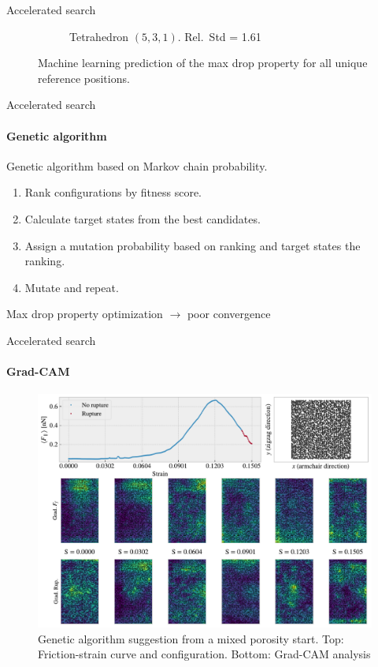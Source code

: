 \documentclass[
	10pt, %
]{beamer}
\begin{document}
\begin{frame}{Accelerated search}
\begin{figure}[H]
\begin{subfigure}[t]{0.49\textwidth}
			\caption{Tetrahedron $(5,3,1)$. Rel.\ Std = 1.61}
		\end{subfigure}
		\caption{Machine learning prediction of the max drop property for all unique reference positions.}
	\end{figure}
\end{frame}
%
%
\begin{frame}{Accelerated search}
	\framesubtitle{Genetic algorithm}
	Genetic algorithm based on Markov chain probability. 
	\begin{enumerate}
		\item Rank configurations by fitness score.
		\item Calculate target states from the best candidates.
		\item Assign a mutation probability based on ranking and target states the ranking.
		\item Mutate and repeat.
	\end{enumerate}
	\vspace*{5mm}
	Max drop property optimization $\to$ poor convergence
\end{frame}
%
%
\begin{frame}{Accelerated search}
	\framesubtitle{Grad-CAM}
	\begin{figure}[H]
		\centering
		\includegraphics[width=0.7\linewidth]{../thesis/figures/search/grad_cam_GA_RN_start_top0.pdf}
		\caption{Genetic algorithm suggestion from a mixed porosity start. Top: Friction-strain curve and configuration. Bottom: Grad-CAM analysis}
	\end{figure}  
\end{frame}
%
%
\end{document}
